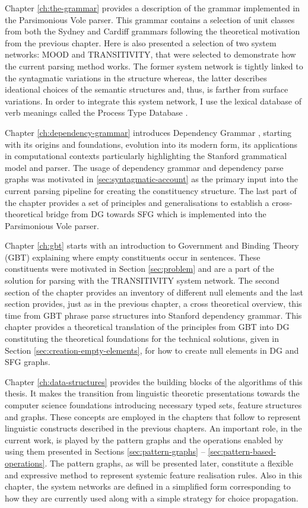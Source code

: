     Chapter \ref{ch:the-grammar} provides a description of the grammar implemented in the Parsimonious Vole parser. This grammar contains a selection of unit classes from both the Sydney and Cardiff grammars following the theoretical motivation from the previous chapter. Here is also presented a selection of two system networks: MOOD and TRANSITIVITY, that were selected to demonstrate how the current parsing method works. The former system network is tightly linked to the syntagmatic variations in the structure whereas, the latter describes ideational choices of the semantic structures and, thus, is farther from surface variations. In order to integrate this system network, I use the lexical database of verb meanings called the Process Type Database \citep{Neale2002}. 

    Chapter \ref{ch:dependency-grammar} introduces Dependency Grammar             \citep{Tesniere59}, starting with its origins and foundations, evolution into its modern form, its applications in computational contexts particularly highlighting the Stanford grammatical model and parser. The usage of dependency grammar and dependency parse graphs was motivated in \ref{sec:syntagmatic-account} as the primary input into the current parsing pipeline for creating the constituency structure. The last part of the chapter provides a set of principles and generalisations to establish a cross-theoretical bridge from DG towards SFG which is implemented into the Parsimonious Vole parser.

    Chapter \ref{ch:gbt} starts with an introduction to Government and Binding Theory (GBT) explaining where empty constituents occur in sentences. These constituents were motivated in Section \ref{sec:problem} and are a part of the solution for parsing with the TRANSITIVITY system network. The second section of the chapter provides an inventory of different null elements and the last section provides, just as in the previous chapter, a cross theoretical overview, this time from GBT phrase parse structures into Stanford dependency grammar. This chapter provides a theoretical translation of the principles from GBT into DG constituting the theoretical foundations for the technical solutions, given in Section \ref{sec:creation-empty-elements}, for how to create null elements in DG and SFG graphs. 

    Chapter \ref{ch:data-structures} provides the building blocks of the algorithms of this thesis. It makes the transition from linguistic theoretic presentations towards the computer science foundations introducing necessary typed sets, feature structures and graphs. These concepts are employed in the chapters that follow to represent linguistic constructs described in the previous chapters. An important role, in the current work, is played by the pattern graphs and the operations enabled by using them presented in Sections \ref{sec:pattern-graphs} -- \ref{sec:pattern-based-operations}. 
    The pattern graphs, as will be presented later, constitute a flexible and expressive method to represent systemic feature realisation rules. Also in this chapter, the system networks are defined in a simplified form corresponding to how they are currently used along with a simple strategy for choice propagation. 


